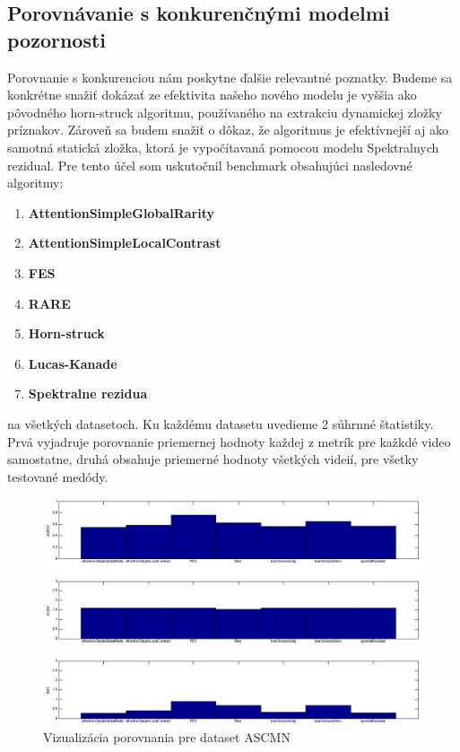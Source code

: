 \subsection{Porovnávanie s konkurenčnými modelmi pozornosti}
Porovnanie s konkurenciou nám poskytne ďalšie relevantné poznatky.
Budeme sa konkrétne snažiť dokázať ze efektivita našeho nového modelu je vyššia ako pôvodného horn-struck algoritmu\cite{horn-schunck}, používaného na extrakciu dynamickej zložky príznakov.
Zároveň sa budem snažiť o dôkaz, že algoritmus je efektívnejší aj ako samotná statická zložka, ktorá je vypočítavaná pomocou modelu Spektralnych rezidual\cite{spectral-rezidual}.
Pre tento účel som uskutočnil benchmark obsahujúci nasledovné algoritmy:
\begin{enumerate}
  \item\textbf{AttentionSimpleGlobalRarity\cite{global-rarity}}
  \item\textbf{AttentionSimpleLocalContrast\cite{global-rarity}}
  \item\textbf{FES\cite{fes}}
  \item\textbf{RARE\cite{rare-1}}
  \item\textbf{Horn-struck\cite{horn-schunck}}
  \item\textbf{Lucas-Kanade\cite{lucas-kanade}}
  \item\textbf{Spektralne rezidua\cite{spectral-rezidual}}
\end{enumerate}
na všetkých datasetoch.
Ku každému datasetu uvedieme 2 súhrnné štatistiky.
Prvá vyjadruje porovnanie priemernej hodnoty každej z metrík pre kažkdé video samostatne, druhá obsahuje priemerné hodnoty všetkých videií, pre všetky testované medódy.

\begin{figure}[H]
  \includegraphics[width=15cm]{pics/porovnanie-accv-global-new.png}
  \caption{Vizualizácia porovnania pre dataset ASCMN\cite{accv}}
\end{figure}

